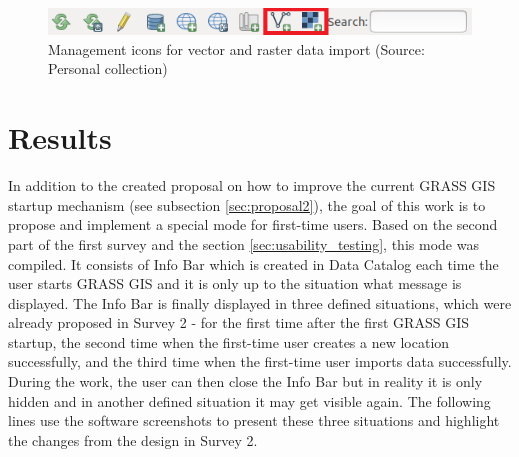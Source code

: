 \documentclass[a4paper,10pt,twoside]{article}
\begin{document}
\vspace{0.3cm}
\begin{figure}[hbt!] 
\begin{center}
\includegraphics[width=15cm]{../pictures/icons.png} 
\caption[Management icons for vector and raster data import]{Management icons for vector and raster data import (Source: Personal collection)}
\label{fig:icons}
\end{center}
\end{figure}

\newpage
\vspace*{-1cm}
\section{Results}
\label{sec:results}
\noindent
\large

\noindent In addition to the created proposal on how to improve the current GRASS GIS startup mechanism (see subsection \ref{sec:proposal2}), the goal of this work is to propose and implement a special mode for first-time users. Based on the second part of the first survey and the section \ref{sec:usability_testing}, this mode was compiled. It consists of Info Bar which is created in Data Catalog each time the user starts GRASS GIS and it is only up to the situation what message is displayed. The Info Bar is finally displayed in three defined situations, which were already proposed in Survey 2 - for the first time after the first GRASS GIS startup, the second time when the first-time user creates a new location successfully, and the third time when the first-time user imports data successfully. During the work, the user can then close the Info Bar but in reality it is only hidden and in another defined situation it may get visible again. The following lines use the software screenshots to present these three situations and highlight the changes from the design in Survey 2.
\end{document}
